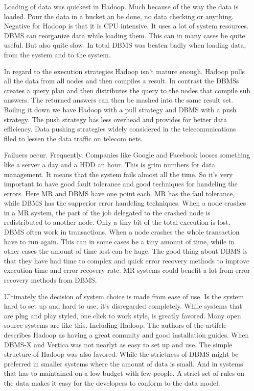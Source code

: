 \documentclass[11pt, a4paper]{article}
\begin{document}
Loading of data was quickest in Hadoop. Much because of the way the data is loaded. Pour the data in a bucket an be done, no data checking or anything. Negative for Hadoop is that it is CPU intensive. It uses a lot of system resources. 
DBMS can reorganize data while loading them. This can in many cases be quite useful. But also quite slow. 
In total DBMS was beaten badly when loading data, from the system and to the system. 

In regard to the execution strategies Hadoop isn't mature enough. Hadoop pulls all the data from all nodes and then compiles a result. 
In contrast the DBMSs creates a query plan and then distributes the query to the nodes that compile sub answers. The returned answers can then be mashed into the same result set. 
Boiling it down we have Hadoop with a pull strategy and DBMS with a push strategy. The push strategy has less overhead and provides for better data efficiency. Data pushing strategies widely considered in the telecomunications filed to lessen the data traffic on telecom nets. 
 
Failuers occur. Frequently. Companies like Google and Facebook looses something like a server a day and a HDD an hour. This is grim numbers for data management. It means that the system fails almost all the time. So it's very important to have good fault tolerance and good techniques for handeling the errors.
Here MR and DBMS have one point each. MR has the faul tolerance, while DBMS has the supperior error handeling techniques. 
When a node crashes in a MR system, the part of the job delegated to the crashed node is redistributed to another node. Only a tiny bit of the total execution is lost. 
DBMS often work in transactions. When a node crashes the whole transaction have to run again. This can in some cases be a tiny amount of time, while in other cases the amount of time lost can be huge. 
The good thing about DBMS is that they have had time to complex and quick error recovery methods to improve execution time and error recovery rate.
MR systems could benefit a lot from error recovery methods from DBMS. 

Ultimately the decision of system choice is made from ease of use. Is the system hard to set up and hard to use, it's disregarded completely. 
While systems that are plug and play styled, one click to work style, is greatly favored. Many open source systems are like this. Including Hadoop.
The authors of the artifcle describes Hadoop as having a great comunity and good installation guides. When DBMS-X and Vertica was not nearlyt as easy to set up and use. The simple structure of Hadoop was also favored. While the strictness of DBMS might be preferred in smaller systems where the amount of data is small. And in systems that has to maintained on a low budget with few people. A strict set of rules on the data makes it easy for the developers to conform to the data model. 
\end{document}
